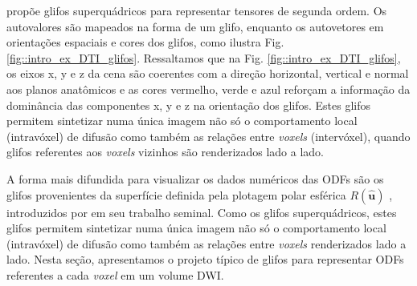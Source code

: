 \documentclass[
    12pt,                %
    oneside,            %
    a4paper,            %
    english,            %
    french,                %
    spanish,            %
    brazil                %
    ]{abntex2}
\begin{document}

  propõe glifos superquádricos para representar tensores de segunda ordem. Os autovalores são mapeados na forma de um glifo, enquanto os autovetores em orientações espaciais e cores dos glifos, como ilustra Fig. \ref{fig::intro_ex_DTI_glifos}. Ressaltamos que na Fig. \ref{fig::intro_ex_DTI_glifos}, os eixos x, y e z da cena são coerentes com a direção horizontal, vertical e normal aos planos anatômicos e as cores vermelho, verde e azul reforçam a informação da dominância das componentes x, y e z na orientação dos glifos. Estes glifos permitem sintetizar numa única imagem não só o comportamento local (intravóxel) de difusão como também as relações entre \textit{voxels} (intervóxel), quando glifos referentes aos \textit{voxels} vizinhos são renderizados lado a lado.

A forma mais difundida para visualizar os dados numéricos das ODFs são os glifos provenientes da superfície definida pela plotagem polar esférica $R(\mathbf{\hat{u}})$ \cite{descoteaux2015, TuchQBall2004}, introduzidos por  em seu trabalho seminal. Como os glifos superquádricos, estes glifos permitem sintetizar numa única imagem não só o comportamento local (intravóxel) de difusão como também as relações entre \textit{voxels} renderizados lado a lado.
Nesta seção, apresentamos o projeto típico de glifos para representar ODFs referentes a cada \textit{voxel} em um volume DWI.

\end{document}
